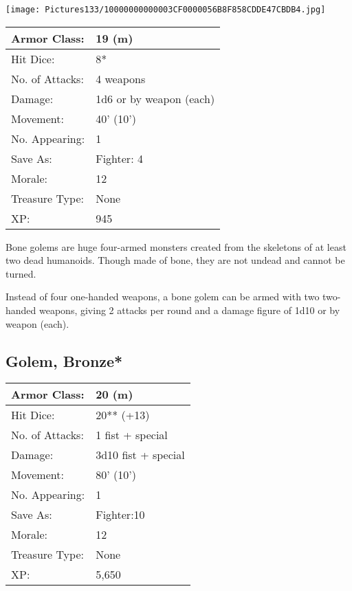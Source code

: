 \documentclass[a4paper,twoside,openany,10pt]{book}
\begin{document}
\begin{multicols}{2}
\begin{center}
	\texttt{[image: Pictures133/10000000000003CF0000056B8F858CDDE47CBDB4.jpg]}
\end{center}

\begin{center}
	\begin{tabularx}{0.48\textwidth}{@{}lX@{}}
Armor Class: & 19 (m) \\\hline
Hit Dice: & 8* \\\hline
No. of Attacks: & 4 weapons \\\hline
Damage: & 1d6 or by weapon (each) \\\hline
Movement: & 40' (10') \\\hline
No. Appearing: & 1 \\\hline
Save As: & Fighter: 4 \\\hline
Morale: & 12 \\\hline
Treasure Type: & None \\\hline
XP: & 945 \\\hline
\end{tabularx}\medskip
\end{center}

Bone golems are huge four-armed monsters created from the skeletons of at least two dead humanoids. Though made of bone, they are not undead and cannot be turned.

Instead of four one-handed weapons, a bone golem can be armed with two two-handed weapons, giving 2 attacks per round and a damage figure of 1d10 or by weapon (each).



\subsection*{Golem, Bronze*}\label{golem-bronze}

\begin{tabularx}{0.48\textwidth}{@{}lX@{}}
Armor Class: & 20 (m) \\\hline
Hit Dice: & 20** (+13) \\\hline
No. of Attacks: & 1 fist + special \\\hline
Damage: & 3d10 fist + special \\\hline
Movement: & 80' (10') \\\hline
No. Appearing: & 1 \\\hline
Save As: & Fighter:10 \\\hline
Morale: & 12 \\\hline
Treasure Type: & None \\\hline
XP: & 5,650 \\\hline
\end{tabularx}\medskip


\end{multicols}
\end{document}
